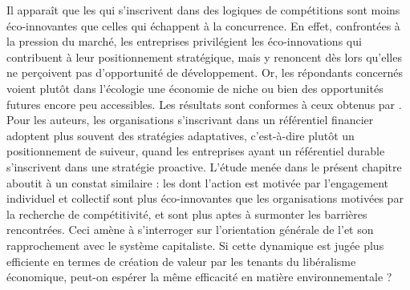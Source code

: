         Il apparaît que les \oess qui s'inscrivent dans des logiques de compétitions sont moins éco-innovantes que celles qui échappent à la concurrence. En effet, confrontées à la pression du marché, les entreprises privilégient les éco-innovations qui contribuent à leur positionnement stratégique, mais  y renoncent dès lors qu'elles ne perçoivent pas d'opportunité de développement. Or, les répondants concernés voient plutôt dans l'écologie une économie de niche ou bien des opportunités futures encore peu accessibles.
        Les résultats sont conformes à ceux obtenus par \textcite{mathieu2015les}. Pour les auteurs, les organisations s'inscrivant dans un référentiel financier adoptent plus souvent des stratégies adaptatives, c'est-à-dire plutôt un positionnement de suiveur, quand les entreprises ayant un référentiel durable s'inscrivent dans une stratégie proactive. L'étude menée dans le présent chapitre aboutit à un constat similaire : les \eess dont l'action est motivée par l'engagement individuel et collectif sont plus éco-innovantes que les organisations motivées par la recherche de compétitivité, et sont plus aptes à surmonter les barrières rencontrées. Ceci amène à s'interroger sur l'orientation générale de l'\ess et son rapprochement avec le système capitaliste. Si cette dynamique est jugée plus efficiente en termes de création de valeur par les tenants du libéralisme économique, peut-on espérer la même efficacité en matière environnementale ? \\







